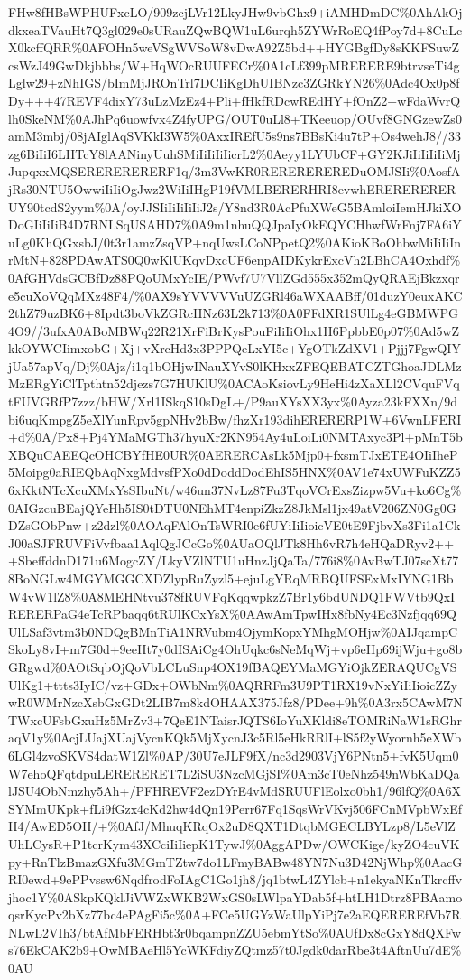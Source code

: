 \documentclass[]{article}
\begin{document}
FHw8fHBsWPHUFxcLO/909zcjLVr12LkyJHw9vbGhx9+iAMHDmDC\%0AhAkOjdkxeaTVauHt7Q3gl029e0sURauZQwBQW1uL6urqh5ZYWrRoEQ4fPoy7d+8CuLcX0kcffQRR\%0AFOHn5weVSgWVSoW8vDwA92Z5bd++HYGBgfDy8sKKFSuwZcsWzJ49GwDkjbbbs/W+HqWOcRUUFECr\%0A1cLf399pMRERERE9btrvseTi4gLglw29+zNhIGS/bImMjJROnTrl7DCIiKgDhUIBNzc3ZGRkYN26\%0Adc4Ox0p8fDy+++47REVF4dixY73uLzMzEz4+Pli+fHkfRDcwREdHY+fOnZ2+wFdaWvrQlh0SkeNM\%0AJhPq6uowfvx4Z4fyUPG/OUT0uLl8+TKeeuop/OUvf8GNGzewZs0amM3mbj/08jAIglAqSVKkI3W5\%0AxxIREfU5s9ns7BBsKi4u7tP+Os4wehJ8//33zg6BiIiI6LHTcY8lAANinyUuhSMiIiIiIiIicrL2\%0Aeyy1LYUbCF+GY2KJiIiIiIiIiMjJupqxxMQSERERERERERF1q/3m3VwKR0REREREREREDuOMJSIi\%0AosfAjRs30NTU5OwwiIiIiOgJwz2WiIiIHgP19fVMLBERERHRI8evwhERERERERERUY90tcdS2yym\%0A/oyJJSIiIiIiIiIiJ2s/Y8nd3R0AcPfuXWeG5BAmloiIemHJkiXODoGIiIiIiB4D7RNLSqUSAHD7\%0A9m1nhuQQJpaIyOkEQYCHhwfWrFnj7FA6iYuLg0KhQGxsbJ/0t3r1amzZsqVP+nqUwsLCoNPpetQ2\%0AKioKBoOhbwMiIiIiInrMtN+828PDAwATS0Q0wKlUKqvDxcUF6enpAIDKykrExcVh2LBhCA4Oxhdf\%0AfGHVdsGCBfDz88PQoUMxYcIE/PWvf7U7VllZGd555x352mQyQRAEjBkzxqre5cuXoVQqMXz48F4/\%0AX9sYVVVVVuUZGRl46aWXAABff/01duzY0euxAKC2thZ79uzBK6+8Ipdt3boVkZGRcHNz63L2k713\%0A0FFdXR1SUlLg4eGBMWPG4O9//3ufxA0ABoMBWq22R21XrFiBrKysPouFiIiIiOhx1H6PpbbE0p07\%0Ad5wZkkOYWCIimxobG+Xj+vXrcHd3x3PPPQeLxYI5c+YgOTkZdXV1+Pjjj7FgwQIYjUa57apVq/Dj\%0Ajz/i1q1bOHjwINauXYvS0lKHxxZFEQEBATCZTGhoaJDLMzMzERgYiClTpthtn52djezs7G7HUKlU\%0ACAoKsiovLy9HeHi4zXaXLl2CVquFVqtFUVGRfP7zzz/bHW/Xrl1ISkqS10sDgL+/P9auXYsXX3yx\%0Ayza23kFXXn/9dbi6uqKmpgZ5eXlYunRpv5gpNHv2bBw/fhzXr193dihERERERP1W+6VwnLFERI+d\%0A/Px8+Pj4YMaMGTh37hyuXr2KN954Ay4uLoiLi0NMTAxyc3Pl+pMnT5bXBQuCAEEQcOHCBYfHE0UR\%0AERERCAsLk5Mjp0+fxsmTJxETE4OIiIheP5Moipg0aRIEQbAqNxgMdvsfPXo0dDoddDodEhIS5HNX\%0AV1e74xUWFuKZZ56xKktNTcXcuXMxYsSIbuNt/w46un37NvLz87Fu3TqoVCrExsZizpw5Vu+ko6Cg\%0AIGzcuBEajQYeHh5IS0tDTU0NEhMT4enpiZkzZ8JkMsl1jx49atV206ZN0Gg0GDZsGObPnw+z2dzl\%0AOAqFAlOnTsWRI0e6fUYiIiIioicVE0tE9FjbvXs3Fi1a1CkJ00aSJFRUVFiVvfbaa1AqlQgJCcGo\%0AUaOQlJTk8Hh6vR7h4eHQaDRyv2+++SbeffddnD171u6MogcZY/LkyVZlNTU1uHnzJjQaTa/776i8\%0AvBwTJ07scXt778BoNGLw4MGYMGGCXDZlypRuZyzl5+ejuLgYRqMRBQUFSExMxIYNG1BbW4vW1lZ8\%0A8MEHNtvu378fRUVFqKqqwpkzZ7Br1y6bdUNDQ1FWVtb9QxIRERERPaG4eTcRPbaqq6tRUlKCxYsX\%0AAwAmTpwIHx8fbNy4Ec3Nzfjqq69QUlLSaf3vtm3b0NDQgBMnTiA1NRVubm4OjymKopxYMhgMOHjw\%0AIJqampCSkoLy8vI+m7G0d+9eeHt7y0dISAiCg4OhUqkc6sNeMqWj+vp6eHp69ijWju+go8bGRgwd\%0AOtSqbOjQoVbLCLuSnp4OX19fBAQEYMaMGYiOjkZERAQUCgVSUlKg1+ttts3IyIC/vz+GDx+OWbNm\%0AQRRFm3U9PT1RX19vNxYiIiIioicZZywR0WMrNzcXsbGxGDt2LIB7m8kdOHAAX375Jfz8/PDee+9h\%0A3rx5CAwM7NTWxcUFsbGxuHz5MrZv3+7QeE1NTaisrJQTS6IoYuXKldi8eTOMRiNaW1sRGhraqV1y\%0AcjLUajXUajVycnKQk5MjXycnJ3c5Rl5eHkRRlI+lS5f2yWyornh5eXWb6LGl4zvoSKVS4datW1Zl\%0AP/30U7eJLF9fX/nc3d2903VjY6PNtn5+fvK5Uqm0W7ehoQFqtdpuLERERERET7L2iSU3NzcMGjSI\%0Am3cT0eNhz549nWbKaDQalJSU4ObNmzhy5Ah+/PFHREVF2ezDYrE4vMdSRUUFlEolxo0bh1/96lfQ\%0A6XSYMmUKpk+fLi9fGzx4cKd2hw4dQn19Perr67Fq1SqsWrVKvj506FCnMVpbWxEfH4/AwED5OH/+\%0AfJ/MhuqKRqOx2uD8QXT1DtqbMGECLBYLzp8/L5eVlZUhLCysR+P1tcrKym43XCciIiIiepK1TywJ\%0AggAPDw/OWCKige/kyZO4cuVKpy+RnTlzBmazGXfu3MGmTZtw7do1LFmyBABw48YN7Nu3D42NjWhp\%0AacGRI0ewd+9ePPvssw6NqdfrodFoIAgC1Go1jh8/jq1btwL4ZYlcb+n1ekyaNKnTkrcffvjhoc1Y\%0ASkpKQklJiVWZxWKB2WxGS0sLWlpaYDab5f+htLH1Dtrz8PBAamoqsrKycPv2bXz77bc4ePAgFi5c\%0A+FCe5UGYzWaUlpYiPj7e2aEQEREREfVb7RNLwL2VIh3/btAfMbFERHbt3r0bqampnZZU5ebmYtSo\%0AUfDx8cGxY8dQXFws76EkCAK2b9+OwMBAeHl5YcWKFdiyZQtmz57t0Jgdk0darRbe3t4AftnUu7dE\%0AU
\end{document}
